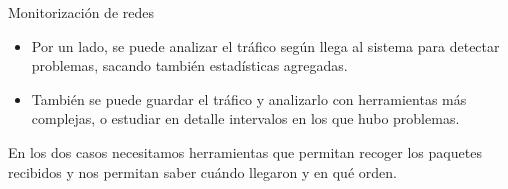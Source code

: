 \documentclass[10pt,notes,compress,usetitleprogressbar,aspectratio=1610]{beamer}
\begin{document}
\begin{frame}{Monitorización de redes}

\begin{itemize}
\item Por un lado, se puede analizar el tráfico según llega al sistema para detectar problemas, sacando también estadísticas agregadas. 
\item También se puede guardar el tráfico y analizarlo con herramientas más complejas, o estudiar en detalle intervalos en los que hubo problemas.
\end{itemize}

En los dos casos necesitamos herramientas que permitan recoger los paquetes recibidos y nos permitan saber cuándo llegaron y en qué orden. 

\end{frame}
\end{document}
